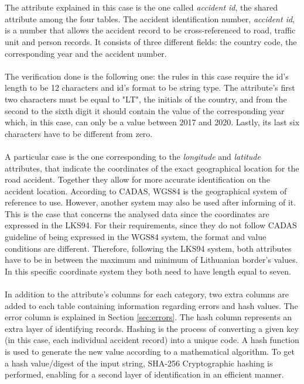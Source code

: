 \\
\\
The attribute explained in this case is the one called \textit{accident id}, the shared attribute among the four tables. The accident identification number, \textit{accident id}, is a number that allows the accident record to be cross-referenced to road, traffic unit and person records. It consists of three different fields: the country code, the corresponding year and the accident number. 
\\
\\
The verification done is the following one: the rules in this case require the id's length to be 12 characters and id's format to be string type. The attribute's first two characters must be equal to "LT", the initials of the country, and from the second to the sixth digit it should contain the value of the corresponding year which, in this case, can only be a value between 2017 and 2020. Lastly, its last six characters have to be different from zero. 
\\
\\
A particular case is the one corresponding to the \textit{longitude} and \textit{latitude} attributes, that indicate the coordinates of the exact geographical location for the road accident. Together they allow for more accurate identification on the accident location. According to \ac{CADAS}, \ac{WGS84} is the geographical system of reference to use. 
However, another system may also be used after informing of it. This is the case that concerns the analysed data since the coordinates are expressed in the \ac{LKS94}. For their requirements, since they do not follow \ac{CADAS} guideline of being expressed in the \ac{WGS84} system, the format and value conditions are different. 
Therefore, following the \ac{LKS94} system, both attributes have to be in between the maximum and minimum of Lithuanian border's values. In this specific coordinate system they both need to have length equal to seven.
\\
\\
In addition to the attribute's columns for each category, two extra columns are added to each table containing information regarding errors and hash values. The error column is explained in Section \ref{sec:errors}. 
The hash column represents an extra layer of identifying records. Hashing is the process of converting a given key (in this case, each individual accident record) into a unique code. A hash function is used to generate the new value according to a mathematical algorithm. To get a hash value/digest of the input string, SHA-256 Cryptographic hashing is performed, enabling for a second layer of identification in an efficient manner. 
